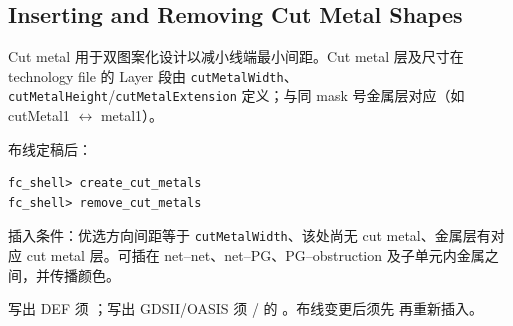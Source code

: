 \subsection*{Inserting and Removing Cut Metal Shapes}

Cut metal 用于双图案化设计以减小线端最小间距。Cut metal 层及尺寸在 technology file 的 Layer 段由 \texttt{cutMetalWidth}、\texttt{cutMetalHeight}/\texttt{cutMetalExtension} 定义；与同 mask 号金属层对应（如 cutMetal1 $\leftrightarrow$ metal1）。

布线定稿后：
\begin{lstlisting}
fc_shell> create_cut_metals
fc_shell> remove_cut_metals
\end{lstlisting}

插入条件：优选方向间距等于 \texttt{cutMetalWidth}、该处尚无 cut metal、金属层有对应 cut metal 层。可插在 net--net、net--PG、PG--obstruction 及子单元内金属之间，并传播颜色。

写出 DEF 须 ；写出 GDSII/OASIS 须 / 的 。布线变更后须先  再重新插入。
